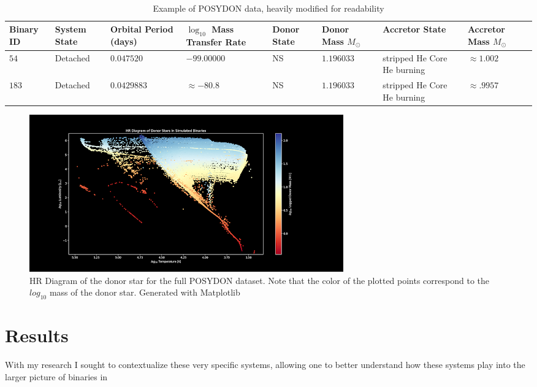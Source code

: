 \documentclass[12pt, letterpaper]{article}
\begin{document}
         \begin{table}[h]
            \centering\
            \footnotesize
            \begin{tabularx}{\textwidth}{||X | X | X | X | X | X | X | X ||}
                \hline
                \textbf{Binary ID} & 
                \textbf{System State} & 
                \textbf{Orbital Period (days)} & 
                \boldmath$\log_{10}$ \textbf{Mass Transfer Rate} & 
                \textbf{Donor State} & 
                \textbf{Donor Mass} $M_\odot$ & 
                \textbf{Accretor State} & 
                \textbf{Accretor Mass} $M_\odot$
                \\ \hline
                $54$ & Detached & $0.047520$ & $-99.00000$ & NS & $1.196033$ & stripped He Core He burning & $\approx 1.002$ \\
                \hline
                $183$ & Detached & $0.0429883$ & $ \approx -80.8$ & NS & $1.196033$ & stripped He Core He burning & $\approx .9957$ \\
                \hline
            \end{tabularx}
            \caption{Example of POSYDON data, heavily modified for readability}
            \label{POSYDONDataExample}
        \end{table}

        \begin{figure} [h]
            \centering
            \includegraphics[width = \textwidth]{figs/EntireDataSetHR.png}
            \caption{HR Diagram of the donor star for the full POSYDON dataset. Note that the color of the plotted points correspond to the $log_{10}$ mass of the donor star. Generated with Matplotlib}
        \end{figure}
        \pagebreak

\section{\centering Results}
    With my research I sought to contextualize these very specific systems, allowing one to better understand how these systems play into the larger picture of binaries in
    
\end{document}
